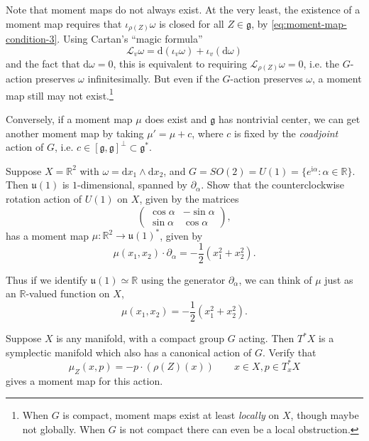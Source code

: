 \documentclass[12pt,letterpaper,reqno]{article}
\numberwithin{equation}{section}
\newcommand{\fg}{{\mathfrak g}}
\newcommand{\fu}{{\mathfrak u}}
\newcommand{\cL}{\ensuremath{\mathcal L}}
\newcommand{\R}{\ensuremath{\mathbb R}}
\newcommand{\half}{\ensuremath{\frac{1}{2}}}
\newcommand{\I}{{\mathrm i}}
\newcommand{\de}{\mathrm{d}}
\newcommand{\ti}[1]{\textit{#1}}
\begin{document}
Note that moment maps do not always exist.
At the very least, the existence of a moment
map requires that $\iota_{\rho(Z)} \omega$ is closed
for all $Z \in \fg$, by \eqref{eq:moment-map-condition-3}. Using
Cartan's ``magic formula''
\begin{equation} \label{eq:cartan-magic-formula}
  \cL_v \omega = \de (\iota_v \omega) + \iota_v (\de \omega)
\end{equation}
and the fact that $\de \omega = 0$,
this is equivalent to requiring $\cL_{\rho(Z)}\omega = 0$,
i.e. the $G$-action preserves $\omega$ infinitesimally.
But even if the $G$-action preserves $\omega$,
a moment map still may not exist.\footnote{When $G$ is compact,
moment maps exist at least
\ti{locally} on $X$, though maybe not globally. When $G$ is not
compact there can even be a local obstruction.}

Conversely, if a moment map $\mu$ does exist and $\fg$
has nontrivial center, we can get another moment map by taking
$\mu' = \mu + c$, where $c$ is fixed by the \ti{coadjoint}
action of $G$, i.e. $c \in [\fg,\fg]^\perp \subset \fg^*$.

\begin{exercise}
Suppose $X = \R^2$ with $\omega = \de x_1 \wedge \de x_2$, and
$G = SO(2) = U(1) = \{e^{\I \alpha}: \alpha \in \R \}$.
Then $\fu(1)$ is $1$-dimensional, spanned by $\partial_\alpha$.
Show that the counterclockwise rotation action of $U(1)$ on $X$,
given by the matrices
\begin{equation}
   \begin{pmatrix} \cos \alpha & - \sin \alpha \\ \sin \alpha & \cos \alpha \end{pmatrix},
 \end{equation}
has a moment map $\mu: \R^2 \to \fu(1)^*$, given by
\begin{equation}
  \mu(x_1,x_2) \cdot \partial_\alpha = -\half (x_1^2 + x_2^2).
\end{equation}
\end{exercise}
Thus if we identify $\fu(1) \simeq \R$ using the generator
$\partial_\alpha$, we can think of $\mu$ just as an $\R$-valued function
on $X$,
\begin{equation}
  \mu(x_1,x_2) = -\half (x_1^2 + x_2^2).
\end{equation}

\begin{exercise} \label{exc:cotangent-moment-map}
Suppose $X$ is any manifold, with a compact
group $G$ acting. Then $T^* X$ is a symplectic manifold
which also has a canonical action of $G$. Verify that
\begin{equation}
  \mu_Z(x,p) = -p \cdot (\rho(Z)(x)) \qquad x \in X, p \in T^*_x X
\end{equation}
gives a moment map for this action.
\end{exercise}


\printbibliography
\end{document}
